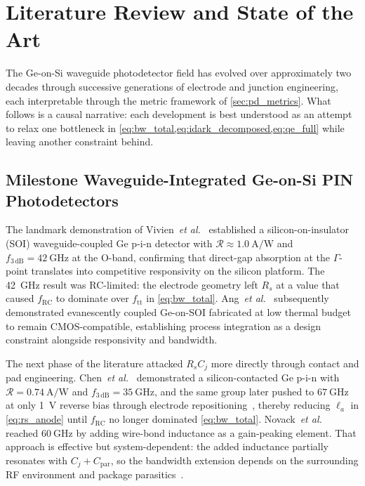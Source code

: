 \section[Literature Review]{Literature Review and State of the Art}
\label{sec:pd_literature}

The Ge-on-Si waveguide photodetector field has evolved over approximately two
decades through successive generations of electrode and junction engineering,
each interpretable through the metric framework of \cref{sec:pd_metrics}.
What follows is a causal narrative: each development is best understood as an
attempt to relax one bottleneck in \cref{eq:bw_total,eq:idark_decomposed,eq:qe_full}
while leaving another constraint behind.

\subsection[Milestone Waveguide-Integrated PIN Photodetectors]{Milestone
Waveguide-Integrated Ge-on-Si PIN Photodetectors}
\label{subsec:pd_history}

The landmark demonstration of Vivien~\textit{et al.}~\cite{Vivien2009} established
a silicon-on-insulator (SOI) waveguide-coupled Ge p-i-n detector with
$\mathcal{R}\approx\SI{1.0}{\ampere\per\watt}$ and
$f_{3\,\mathrm{dB}}=\SI{42}{\giga\hertz}$ at the O-band, confirming that
direct-gap absorption at the $\Gamma$-point translates into competitive
responsivity on the silicon platform. The \SI{42}{\giga\hertz} result was
RC-limited: the electrode geometry left $R_s$ at a value that caused
$f_{\mathrm{RC}}$ to dominate over $f_{\mathrm{tt}}$ in \cref{eq:bw_total}.
Ang~\textit{et al.}~\cite{Ang2010} subsequently demonstrated evanescently coupled
Ge-on-SOI fabricated at low thermal budget to remain CMOS-compatible, establishing
process integration as a design constraint alongside responsivity and bandwidth.

The next phase of the literature attacked $R_sC_j$ more directly through contact
and pad engineering. Chen~\textit{et al.}~\cite{Chen2015} demonstrated a
silicon-contacted Ge p-i-n with $\mathcal{R}=\SI{0.74}{\ampere\per\watt}$ and
$f_{3\,\mathrm{dB}}=\SI{35}{\giga\hertz}$, and the same group later pushed to
$\SI{67}{\giga\hertz}$ at only \SI{1}{\volt} reverse bias through electrode
repositioning~\cite{Chen2016Si}, thereby reducing $\ell_a$ in \cref{eq:rs_anode}
until $f_{\mathrm{RC}}$ no longer dominated \cref{eq:bw_total}.
Novack~\textit{et al.}~\cite{Novack2013} reached $\SI{60}{\giga\hertz}$ by
adding wire-bond inductance as a gain-peaking element. That approach is effective
but system-dependent: the added inductance partially resonates with $C_j+C_{\mathrm{par}}$,
so the bandwidth extension depends on the surrounding RF environment and package
parasitics~\cite{Yan2024}.

